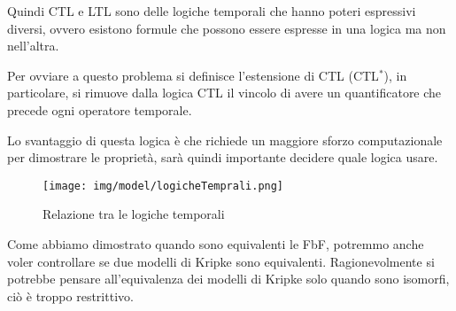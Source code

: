 Quindi CTL e LTL sono delle logiche temporali che hanno poteri espressivi diversi,
ovvero esistono formule che possono essere espresse in una logica ma non nell'altra.

Per ovviare a questo problema si definisce l'estensione di CTL (CTL$^\ast$),
in particolare, si rimuove dalla logica CTL il vincolo di avere un quantificatore
che precede ogni operatore temporale.

Lo svantaggio di questa logica è che richiede un maggiore sforzo computazionale
per dimostrare le proprietà, sarà quindi importante decidere quale logica usare.
\begin{figure}[!ht]
    \centering
    \texttt{[image: img/model/logicheTemprali.png]}
    \caption{Relazione tra le logiche temporali}
\end{figure}
Come abbiamo dimostrato quando sono equivalenti le FbF, potremmo anche voler
controllare se due modelli di Kripke sono equivalenti. Ragionevolmente si potrebbe
pensare all'equivalenza dei modelli di Kripke solo quando sono isomorfi, ciò 
è troppo restrittivo.

